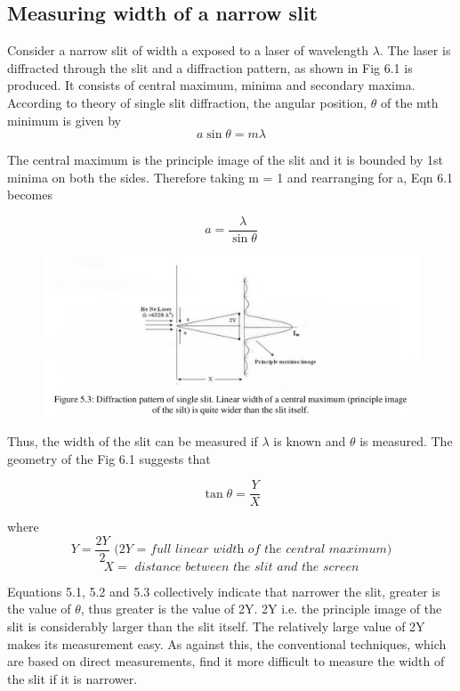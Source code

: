 \documentclass[11pt]{article}
\begin{document}
\subsection{Measuring width of a narrow slit}

	Consider a narrow slit of width a exposed to a laser of wavelength $\lambda$. The laser is diffracted
	through the slit and a diffraction pattern, as shown in Fig 6.1 is produced. It consists of central
	maximum, minima and secondary maxima. According to theory of single slit diffraction, the
	angular position, $\theta$ of the mth minimum is given by
	\begin{equation}
		a \sin\theta = m\lambda
	\end{equation}

	The central maximum is the principle image of the slit and it is bounded by 1st minima on both
	the sides. Therefore taking m = 1 and rearranging for a, Eqn 6.1 becomes

	\begin{equation}
		a = \frac{\lambda}{\sin\theta}
	\end{equation}
	\begin{figure}[H]
		\centering
		\includegraphics[scale=0.4]{2.png}
		\label{it}
	\end{figure}
	
	Thus, the width of the slit can be measured if $\lambda$ is known and $\theta$ is measured. The geometry of
the Fig 6.1 suggests that

\begin{equation}
	\tan\theta = \frac{Y}{X}
\end{equation}


where $$Y=\frac{2Y}{2} \textit{ (2Y = full linear width of the central maximum)}$$
$$ X = \textit{ distance between the slit and the screen}$$

Equations 5.1, 5.2 and 5.3 collectively indicate that narrower the slit, greater is the value of $\theta$,
thus greater is the value of 2Y. 2Y i.e. the principle image of the slit is considerably larger than
the slit itself. The relatively large value of 2Y makes its measurement easy. As against this, the
conventional techniques, which are based on direct measurements, find it more difficult to
measure the width of the slit if it is narrower.
\end{document}
